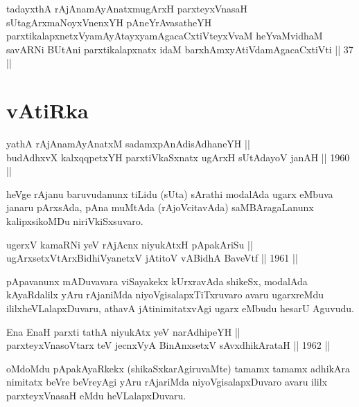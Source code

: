 \begin{shl}
tadayxthA rAjAnamAyAnatxmugArxH parxteyxVnasaH sUtagArxmaNoyxV\s nenxYH pAneYrAvasatheYH parxtikalapxnetxV\s yamAyAtayxyamAgacaCxtiVteyxVvaM heYvaMvidhaM savARNi BUtAni parxtikalapxnatx idaM barxhAmxyAtiVdamAgacaCxtiVti || 37 ||
\end{shl}

\section*{vAtiRka}

\begin{shl}
yathA rAjAnamAyAnatxM sadamxpAnAdisAdhaneYH || \\
budAdhxvX kalxqqpetxYH parxtiVkaSxnatx ugArxH sUtAdayoV janAH \hfill || 1960 ||
  
\end{shl}

\begin{artha}
heVge rAjanu baruvudanunx tiLidu (sUta) sArathi modalAda ugarx eMbuva
janaru pArxsAda, pAna muMtAda (rAjoVcitavAda) saMBAragaLanunx
kalipxsikoMDu niriVkiSxsuvaro.
\end{artha}


\begin{shl}
ugerxV kamaRNi yeV rAjAcnx niyukAtxH pApakAriSu || \\
ugArxsetxV\s tArxBidhiVyanetxV \footnotemark[1]jAtitoV vA\s BidhA BaveVtf \hfill || 1961 ||
  
\end{shl}

\begin{artha}
pApavanunx mADuvavara viSayakekx kUrxravAda shikeSx, modalAda
kAyaRdalilx yAru rAjaniMda niyoVgisalapxTiTxruvaro avaru ugarxreMdu
ililxheVLalapxDuvaru, athavA jAtinimitatxvAgi ugarx eMbudu hesarU Aguvudu.
\end{artha}


\begin{shl}
Ena EnaH parxti tathA niyukAtx yeV narAdhipeYH || \\
parxteyxVnasoV\s tarx teV jecnxVyA BinAnxsetxV sAvxdhikArataH \hfill || 1962 ||
  
\end{shl}

\begin{artha}
oMdoMdu pApakAyaRkekx (shikaSxkarAgiruvaMte) tamamx tamamx adhikAra
nimitatx beVre beVreyAgi yAru rAjariMda niyoVgisalapxDuvaro avaru
ililx parxteyxVnasaH eMdu heVLalapxDuvaru.
\end{artha}

